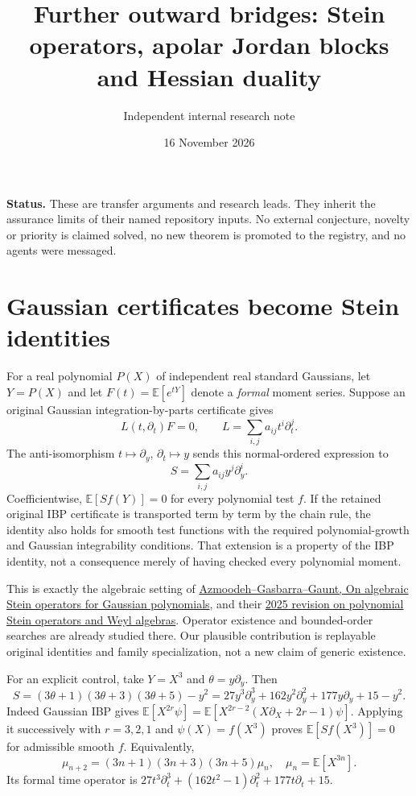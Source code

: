 \documentclass[11pt]{article}
\title{Further outward bridges: Stein operators, apolar Jordan blocks and Hessian duality}
\author{Independent internal research note}
\date{16 November 2026}
\newcommand{\E}{\mathbb E}
\begin{document}
\maketitle
\noindent\textbf{Status.}
These are transfer arguments and research leads. They inherit the assurance
limits of their named repository inputs. No external conjecture, novelty or
priority is claimed solved, no new theorem is promoted to the registry,
and no agents were messaged.

\section{Gaussian certificates become Stein identities}

For a real polynomial $P(X)$ of independent real standard Gaussians, let
$Y=P(X)$ and let $F(t)=\E[e^{tY}]$ denote a \emph{formal} moment series.
Suppose an original Gaussian integration-by-parts certificate gives
\[
       L(t,\partial_t)F=0,\qquad
       L=\sum_{i,j}a_{ij}t^i\partial_t^j.
\]
The anti-isomorphism $t\mapsto\partial_y$, $\partial_t\mapsto y$ sends
this normal-ordered expression to
\[
       S=\sum_{i,j}a_{ij}y^j\partial_y^i.
\]
Coefficientwise, $\E[Sf(Y)]=0$ for every polynomial test $f$. If the
retained original IBP certificate is transported term by term by the
chain rule, the identity also holds for smooth test functions with the
required polynomial-growth and Gaussian integrability conditions. That
extension is a property of the IBP identity, not a consequence merely
of having checked every polynomial moment.

This is exactly the algebraic setting of
\href{https://arxiv.org/abs/1912.04605}{Azmoodeh--Gasbarra--Gaunt,
On algebraic Stein operators for Gaussian polynomials}, and their
\href{https://arxiv.org/abs/2212.07321}{2025 revision on polynomial Stein
operators and Weyl algebras}. Operator existence and bounded-order
searches are already studied there. Our plausible contribution is
replayable original identities and family specialization, not a new
claim of generic existence.

For an explicit control, take $Y=X^3$ and $\theta=y\partial_y$. Then
\[
 S=(3\theta+1)(3\theta+3)(3\theta+5)-y^2
   =27y^3\partial_y^3+162y^2\partial_y^2+
     177y\partial_y+15-y^2.                                  \tag{1}
\]
Indeed Gaussian IBP gives
$\E[X^{2r}\psi]=\E[X^{2r-2}(X\partial_X+2r-1)\psi]$.
Applying it successively with $r=3,2,1$ and $\psi(X)=f(X^3)$ proves
$\E[Sf(X^3)]=0$ for admissible smooth $f$. Equivalently,
\[
 \mu_{n+2}=(3n+1)(3n+3)(3n+5)\mu_n,\quad
 \mu_n=\E[X^{3n}].
\]
Its formal time operator is
$27t^3\partial_t^3+(162t^2-1)\partial_t^2+
177t\partial_t+15$.
\end{document}
